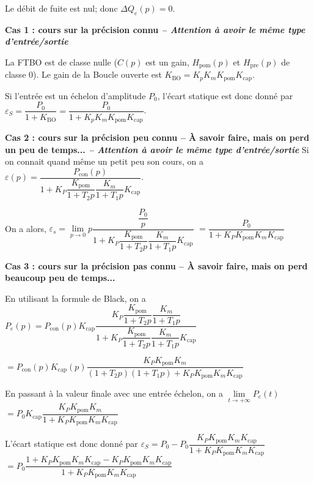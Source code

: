 \begin{corrigebox}
Le débit de fuite est nul; donc $\Delta Q_e(p)=0$.

\textbf{Cas 1 : cours sur la précision connu \textit{-- Attention à avoir le même type d'entrée/sortie}}

La FTBO est de classe nulle ($C(p)$ est un gain, $H_{\text{pom}} (p)$ et $H_{\text{pre}} (p)$ de classe 0). Le gain de la Boucle ouverte est $K_{\text{BO}}=K_p K_m K_{\text{pom}}K_{\text{cap}}$.

Si l'entrée est un échelon d'amplitude $P_0$, l'écart statique est donc donné par 
$\varepsilon_S = \dfrac{P_0}{1+K_{\text{BO}}}= \dfrac{P_0}{1+K_p K_m K_{\text{pom}}K_{\text{cap}}}$.

\textbf{Cas 2 : cours sur la précision peu connu -- À savoir faire, mais on perd un peu de temps... \textit{-- Attention à avoir le même type d'entrée/sortie}}
Si on connait quand même un petit peu son cours, on a 
$\varepsilon(p)
=
\dfrac{P_{\text{con}}(p)}
{1+K_P \dfrac{K_{\text{pom}}}{1+T_2 p} \dfrac{K_m}{1+T_1 p} K_{\text{cap}}}$.

On a alors,
$\varepsilon_s = \lim\limits_{p\to 0} p 
\dfrac{\dfrac{P_0}{p}}
{1+K_P \dfrac{K_{\text{pom}}}{1+T_2 p} \dfrac{K_m}{1+T_1 p} K_{\text{cap}}}$
$=
\dfrac{P_0}
{1+K_P K_{\text{pom}}K_m K_{\text{cap}}}
$

\textbf{Cas 3 : cours sur la précision pas connu -- À savoir faire, mais on perd beaucoup peu de temps...}

En utilisant la formule de Black, on a $P_e(p) 
= P_{\text{con}}(p) K_{\text{cap}} 
\dfrac{K_P \dfrac{K_{\text{pom}}}{1+T_2 p} \dfrac{K_m}{1+T_1 p} }
{1+K_P \dfrac{K_{\text{pom}}}{1+T_2 p} \dfrac{K_m}{1+T_1 p} K_{\text{cap}}}$

$= P_{\text{con}}(p) K_{\text{cap}}(p) 
\dfrac{K_P K_{\text{pom}}K_m }
{\left(1+T_2 p\right)\left(1+T_1 p\right)+K_P K_{\text{pom}} K_m K_{\text{cap}}}$

En passant à la valeur finale avec une entrée échelon, on a 
$\lim\limits_{t\to +\infty}P_e(t)$ $ =  P_{0} K_{\text{cap}} 
\dfrac{K_P K_{\text{pom}}K_m }
{1+K_P K_{\text{pom}} K_m K_{\text{cap}}}$

L'écart statique est donc donné par
$
\varepsilon_S = P_0 - P_{0} 
\dfrac{K_P K_{\text{pom}}K_m K_{\text{cap}} }
{1+K_P K_{\text{pom}} K_m K_{\text{cap}}}$
$= P_0
\dfrac{1+K_P K_{\text{pom}} K_m K_{\text{cap}} - K_P K_{\text{pom}}K_m K_{\text{cap}} }{1+K_P K_{\text{pom}} K_m K_{\text{cap}}}
$


\end{corrigebox}
